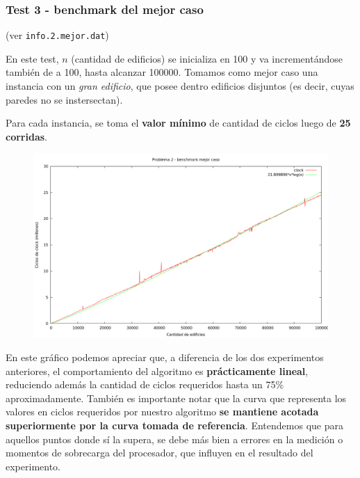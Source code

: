 \newpage


\subsubsection{Test 3 - benchmark del mejor caso}

(ver \verb|info.2.mejor.dat|) \medskip

En este test, $n$ (cantidad de edificios) se inicializa en 100 y va incrementándose también de a 100, 
hasta alcanzar 100000. Tomamos como mejor caso una instancia con un \textit{gran edificio}, que posee dentro 
edificios disjuntos (es decir, cuyas paredes no se instersectan).

Para cada instancia, se toma el \textbf{valor mínimo} de cantidad de ciclos luego de \textbf{25 corridas}.


\begin{figure}[h]
  \begin{center}
    \includegraphics[scale=0.35]{imagenes/grafico-2-mejor.png}
  \end{center}
\end{figure}


En este gráfico podemos apreciar que, a diferencia de los dos experimentos anteriores, el comportamiento 
del algoritmo es \textbf{prácticamente lineal}, reduciendo además la cantidad de ciclos requeridos hasta un 75\% 
aproximadamente. También es importante notar que la curva que representa los valores en ciclos requeridos 
por nuestro algoritmo \textbf{se mantiene acotada superiormente por la curva tomada de referencia}. Entendemos que 
para aquellos puntos donde sí la supera, se debe más bien a errores en la medición o momentos de sobrecarga 
del procesador, que influyen en el resultado del experimento. 
